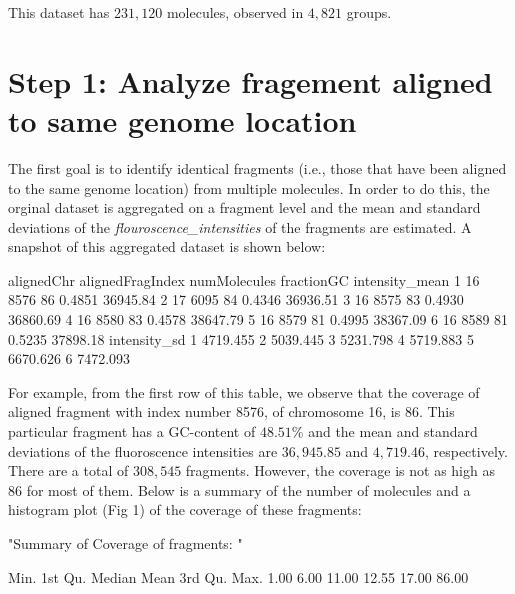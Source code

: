 \documentclass[11pt]{article}
\begin{document}
\noindent
This dataset has $231,120$ molecules, observed in $4,821$ groups. 

\section{Step 1: Analyze fragement aligned to same genome location}
The first goal is to identify identical fragments (i.e., those that have been aligned to the same genome location) from multiple molecules. In order to do this, the orginal dataset is aggregated on a fragment level and the mean and standard deviations of the {\emph{flouroscence\_intensities}} of the fragments are estimated. A snapshot of this aggregated dataset is shown below:

\begin{Schunk}
\begin{Soutput}
  alignedChr alignedFragIndex numMolecules fractionGC intensity_mean
1         16             8576           86     0.4851       36945.84
2         17             6095           84     0.4346       36936.51
3         16             8575           83     0.4930       36860.69
4         16             8580           83     0.4578       38647.79
5         16             8579           81     0.4995       38367.09
6         16             8589           81     0.5235       37898.18
  intensity_sd
1     4719.455
2     5039.445
3     5231.798
4     5719.883
5     6670.626
6     7472.093
\end{Soutput}
\end{Schunk}
For example, from the first row of this table, we observe that the coverage of aligned fragment with index number 8576, of chromosome 16, is 86. This particular fragment has a GC-content of $48.51\%$ and the mean and standard deviations of the fluoroscence intensities are $36,945.85$ and $4,719.46$, respectively. \\
There are a total of $308,545$ fragments. However, the coverage is not as high as 86 for most of them. Below is a summary of the number of molecules and a histogram plot (Fig 1) of the coverage of these fragments:
\begin{Schunk}
\begin{Soutput}
[1] "Summary of Coverage of fragments: "
\end{Soutput}
\begin{Soutput}
   Min. 1st Qu.  Median    Mean 3rd Qu.    Max. 
   1.00    6.00   11.00   12.55   17.00   86.00 
\end{Soutput}
\end{Schunk}
\end{document}

